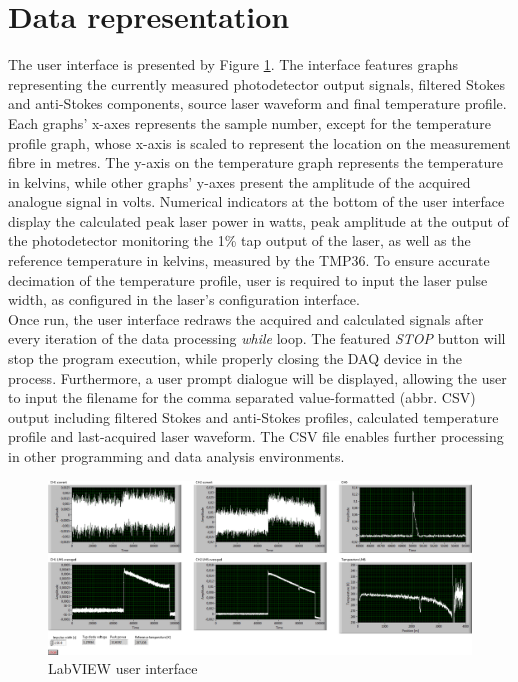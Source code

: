 \documentclass{standalone}
\begin{document}
\section{Data representation}

The user interface is presented by Figure \ref{fig:user_interface}. The interface features graphs representing the currently measured photodetector output signals, filtered Stokes and anti-Stokes components, source laser waveform and final temperature profile. Each graphs' x-axes represents the sample number, except for the temperature profile graph, whose x-axis is scaled to represent the location on the measurement fibre in metres. The y-axis on the temperature graph represents the temperature in kelvins, while other graphs' y-axes present the amplitude of the acquired analogue signal in volts. Numerical indicators at the bottom of the user interface display the calculated peak laser power in watts, peak amplitude at the output of the photodetector monitoring the 1\% tap output of the laser, as well as the reference temperature in kelvins, measured by the TMP36. To ensure accurate decimation of the temperature profile, user is required to input the laser pulse width, as configured in the laser's configuration interface. \\

Once run, the user interface redraws the acquired and calculated signals after every iteration of the data processing \textit{while} loop. The featured \textit{STOP} button will stop the program execution, while properly closing the DAQ device in the process. Furthermore, a user prompt dialogue will be displayed, allowing the user to input the filename for the comma separated value-formatted (abbr. CSV) output including filtered Stokes and anti-Stokes profiles, calculated temperature profile and last-acquired laser waveform. The CSV file enables further processing in other programming and data analysis environments.

\begin{landscape}
	\begin{figure}[h]
		\centering
		\includegraphics[width=1.05\linewidth]{user_interface.png}
		\caption{LabVIEW user interface}
		\label{fig:user_interface}
	\end{figure}
\end{landscape}


\setcounter{stranica}{\thepage}
\addtocounter{stranica}{1}
\end{document}
